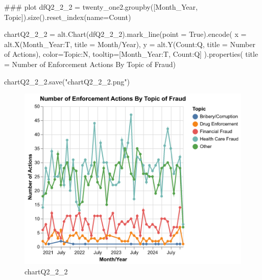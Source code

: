\documentclass[
  letterpaper,
  DIV=11,
  numbers=noendperiod]{scrartcl}
\newenvironment{Shaded}{\begin{snugshade}}{\end{snugshade}}
\newcommand{\CommentTok}[1]{\textcolor[rgb]{0.37,0.37,0.37}{#1}}
\newcommand{\NormalTok}[1]{\textcolor[rgb]{0.00,0.23,0.31}{#1}}
\newcommand{\OperatorTok}[1]{\textcolor[rgb]{0.37,0.37,0.37}{#1}}
\newcommand{\StringTok}[1]{\textcolor[rgb]{0.13,0.47,0.30}{#1}}
\newcommand{\VariableTok}[1]{\textcolor[rgb]{0.07,0.07,0.07}{#1}}
\begin{document}
\begin{Shaded}
\begin{Highlighting}[]
\CommentTok{\#\#\# plot}
\NormalTok{dfQ2\_2\_2 }\OperatorTok{=}\NormalTok{ twenty\_one2.groupby([}\StringTok{\textquotesingle{}Month\_Year\textquotesingle{}}\NormalTok{, }\StringTok{\textquotesingle{}Topic\textquotesingle{}}\NormalTok{]).size().reset\_index(name}\OperatorTok{=}\StringTok{\textquotesingle{}Count\textquotesingle{}}\NormalTok{)}

\NormalTok{chartQ2\_2\_2 }\OperatorTok{=}\NormalTok{ alt.Chart(dfQ2\_2\_2).mark\_line(point }\OperatorTok{=} \VariableTok{True}\NormalTok{).encode(}
\NormalTok{  x }\OperatorTok{=}\NormalTok{ alt.X(}\StringTok{\textquotesingle{}Month\_Year:T\textquotesingle{}}\NormalTok{, title }\OperatorTok{=} \StringTok{\textquotesingle{}Month/Year\textquotesingle{}}\NormalTok{),}
\NormalTok{  y }\OperatorTok{=}\NormalTok{ alt.Y(}\StringTok{\textquotesingle{}Count:Q\textquotesingle{}}\NormalTok{, title }\OperatorTok{=} \StringTok{\textquotesingle{}Number of Actions\textquotesingle{}}\NormalTok{),}
\NormalTok{  color}\OperatorTok{=}\StringTok{\textquotesingle{}Topic:N\textquotesingle{}}\NormalTok{,}
\NormalTok{  tooltip}\OperatorTok{=}\NormalTok{[}\StringTok{\textquotesingle{}Month\_Year:T\textquotesingle{}}\NormalTok{, }\StringTok{\textquotesingle{}Count:Q\textquotesingle{}}\NormalTok{]}
\NormalTok{).properties( title }\OperatorTok{=} \StringTok{\textquotesingle{}Number of Enforcement Actions By Topic of Fraud\textquotesingle{}}\NormalTok{)}

\NormalTok{chartQ2\_2\_2.save(}\StringTok{"chartQ2\_2\_2.png"}\NormalTok{)}
\end{Highlighting}
\end{Shaded}

\begin{figure}[H]

{\centering \includegraphics{chartQ2_2_2.png}

}

\caption{chartQ2\_2\_2}

\end{figure}%
\end{document}
